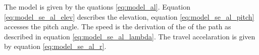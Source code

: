 The model is given by the quations \eqref{eq:model_al}. Equation \eqref{eq:model_se_al_elev} describes the elevation, equation \eqref{eq:model_se_al_pitch} accesses the pitch angle. The speed is the derivation of the of the path as described in equation \eqref{eq:model_se_al_lambda}. The travel accelaration is given by equation \eqref{eq:model_se_al_r}.  

